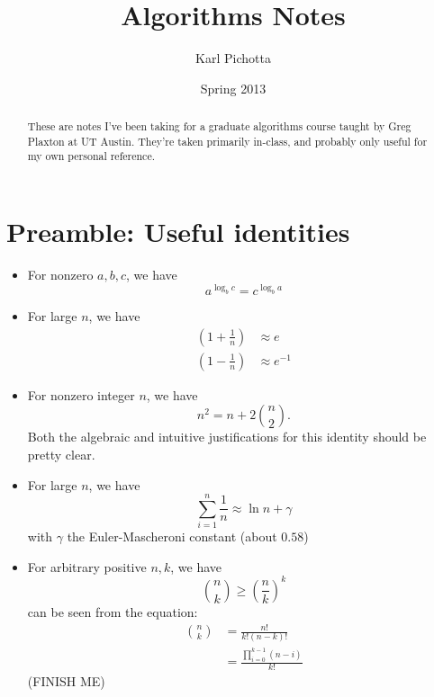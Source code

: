 \documentclass{article}
\title{Algorithms Notes}
\author{Karl Pichotta}
\date{Spring 2013}
\newcommand{\inv}{^{-1}}
\newcommand{\beq}{\begin{equation}}
\newcommand{\eeq}{\end{equation}}
\begin{document}
\maketitle

\begin{abstract}
These are  notes I've been taking for a graduate algorithms
course taught by Greg Plaxton at UT Austin.
They're taken primarily in-class, and probably only useful for my own
 personal reference.
\end{abstract}

\section{Preamble: Useful identities}




\begin{itemize}

	\item For nonzero $a,b,c$, we have
	\beq
	a^{\log_b c} = 
	c^{\log_b a}
	\eeq

	\item
	For large $n$, we have
	\begin{align}
		\left(
			1 + \frac{1}{n}
		\right)
		&\approx 
		e
		\\
		\left(
			1 - \frac{1}{n}
		\right)
		&\approx 
		e\inv
	\end{align}
	
	\item For nonzero integer $n$, we have
	\beq
	n^2 = n + 2{n\choose 2}.
	\eeq
	Both the algebraic and intuitive justifications for this identity
	should be pretty clear.
	
	\item
	For large $n$, we have
	$$
	\sum_{i=1}^n \frac{1}{n} \approx \ln n + \gamma
	$$
	with $\gamma$ the Euler-Mascheroni constant (about $0.58$)
	
	
	
	\item
	For arbitrary positive $n,k$, we have
	$$
	{n\choose k} \geq 
	\left(\frac{n}{k}\right)^k
	$$
	can be seen from the equation:
	\begin{align*}
	{n\choose k} 
	&=
	\frac{n!}{k! (n-k)!}
	\\
	&=
	\frac{\prod_{i=0}^{k-1}(n-i)}
		 {k!}
	\end{align*}
	(FINISH ME)
	
	

\end{itemize}
\end{document}
